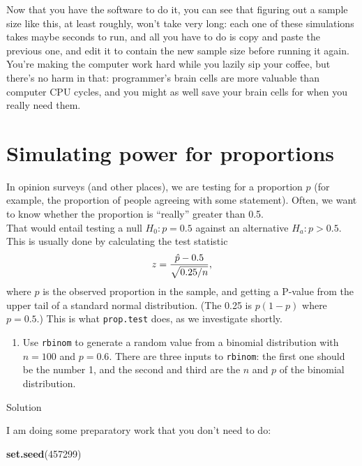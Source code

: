 \documentclass[]{tufte-book}
\newenvironment{Shaded}{}{}
\newcommand{\DecValTok}[1]{\textcolor[rgb]{0.25,0.63,0.44}{#1}}
\newcommand{\KeywordTok}[1]{\textcolor[rgb]{0.00,0.44,0.13}{\textbf{#1}}}
\newcommand{\NormalTok}[1]{#1}
\providecommand{\tightlist}{%
  \setlength{\itemsep}{0pt}\setlength{\parskip}{0pt}}
\theoremstyle{definition}
\theoremstyle{definition}
\theoremstyle{definition}
\theoremstyle{remark}
\begin{document}
Now that you have the software to do it, you can see that figuring out a
sample size like this, at least roughly, won't take very long: each one
of these simulations takes maybe seconds to run, and all you have to do
is copy and paste the previous one, and edit it to contain the new
sample size before running it again. You're making the computer work
hard while you lazily sip your coffee, but there's no harm in that:
programmer's brain cells are more valuable than computer CPU cycles, and
you might as well save your brain cells for when you really need them.

\hypertarget{simulating-power-for-proportions}{%
\section{Simulating power for
proportions}\label{simulating-power-for-proportions}}

In opinion surveys (and other places), we are testing for a proportion
\(p\) (for example, the proportion of people agreeing with some
statement). Often, we want to know whether the proportion is ``really''
greater than 0.5.
\\
That would entail testing a null \(H_0: p=0.5\) against an alternative
\(H_a: p>0.5\). This is usually done by calculating the test statistic
\[ z = { \hat{p} - 0.5 \over \sqrt{0.25/n}},\] where \(\hat{p}\) is the
observed proportion in the sample, and getting a P-value from the upper
tail of a standard normal distribution. (The 0.25 is \(p(1-p)\) where
\(p=0.5\).) This is what \texttt{prop.test} does, as we investigate
shortly.

\begin{enumerate}
\def\labelenumi{(\alph{enumi})}
\tightlist
\item
  Use \texttt{rbinom} to generate a random value from a binomial
  distribution with \(n=100\) and \(p=0.6\). There are three inputs to
  \texttt{rbinom}: the first one should be the number 1, and the second
  and third are the \(n\) and \(p\) of the binomial distribution.
\end{enumerate}

Solution

I am doing some preparatory work that you don't need to do:

\begin{Shaded}
\begin{Highlighting}[]
\KeywordTok{set.seed}\NormalTok{(}\DecValTok{457299}\NormalTok{)}
\end{Highlighting}
\end{Shaded}
\end{document}
